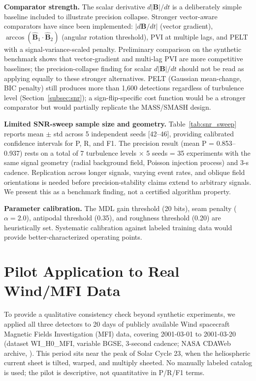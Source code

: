 \documentclass[12pt,letterpaper]{article}
\begin{document}
\textbf{Comparator strength.}
The scalar derivative $d|\mathbf{B}|/dt$ is a deliberately simple baseline
included to illustrate precision collapse.
Stronger vector-aware comparators have since been implemented:
$|d\mathbf{B}/dt|$ (vector gradient), $\arccos(\hat{\mathbf{B}}_1 \cdot
\hat{\mathbf{B}}_2)$ (angular rotation threshold), PVI at multiple lags,
and PELT with a signal-variance-scaled penalty.
Preliminary comparison on the synthetic benchmark shows that vector-gradient
and multi-lag PVI are more competitive baselines; the precision-collapse
finding for scalar $d|\mathbf{B}|/dt$ should not be read as applying equally
to these stronger alternatives.
PELT (Gaussian mean-change, BIC penalty) still produces more than 1{,}600
detections regardless of turbulence level
(Section~\ref{subsec:snr}); a sign-flip-specific cost function would be a
stronger comparator but would partially replicate the MASS/SMASH design.

\textbf{Limited SNR-sweep sample size and geometry.}
Table~\ref{tab:snr_sweep} reports mean $\pm$ std across 5 independent seeds
[42--46], providing calibrated confidence intervals for P, R, and F1.
The precision result (mean P = 0.853--0.937) rests on a total of
7 turbulence levels $\times$ 5 seeds = 35 experiments with the same signal
geometry (radial background field, Poisson injection process) and 3-s cadence.
Replication across longer signals, varying event rates, and oblique field
orientations is needed before precision-stability claims extend to arbitrary
signals.
We present this as a benchmark finding, not a certified algorithm property.

\textbf{Parameter calibration.}
The MDL gain threshold (20 bits), seam penalty ($\alpha = 2.0$), antipodal
threshold (0.35), and roughness threshold (0.20) are heuristically set.
Systematic calibration against labeled training data would provide
better-characterized operating points.

\section{Pilot Application to Real Wind/MFI Data}
\label{sec:real_data}

To provide a qualitative consistency check beyond synthetic experiments,
we applied all three detectors to 20 days of publicly available Wind spacecraft
Magnetic Fields Investigation (MFI) data, covering 2001-03-01 to 2001-03-20
(dataset WI\_H0\_MFI, variable BGSE, 3-second cadence; NASA CDAWeb archive,
\citealt{Lepping1995}).
This period sits near the peak of Solar Cycle 23, when the heliospheric current
sheet is tilted, warped, and multiply sheeted.
No manually labeled catalog is used; the pilot is descriptive, not
quantitative in P/R/F1 terms.
\end{document}
